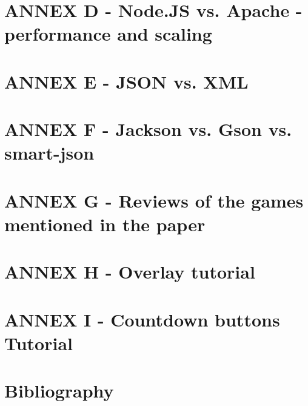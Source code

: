 \documentclass{article}
\begin{document}
\section{ANNEX D - Node.JS vs. Apache - performance and scaling}

\section{ANNEX E - JSON vs. XML}

\section{ANNEX F - Jackson vs. Gson vs. smart-json}

\section{ANNEX G - Reviews of the games mentioned in the paper}

\section{ANNEX H - Overlay tutorial}

\section{ANNEX I - Countdown buttons Tutorial}





\section{Bibliography}
		
	
\end{document}
